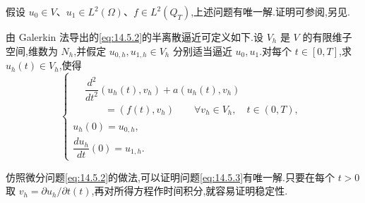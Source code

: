 假设 \(u_0\in V\)、\(u_1\in L^2(\Omega)\)、\(f\in L^2(Q_T)\),上述问题有唯一解.证明可参阅,另见.

由 Galerkin 法导出的\eqref{eq:14.5.2}的半离散逼近可定义如下.设 \(V_h\) 是 \(V\) 的有限维子空间,维数为 \(N_h\),并假定 \(u_{0,h},u_{1,h}\in V_h\) 分别适当逼近 \(u_0,u_1\).对每个 \(t\in[0,T]\),求 \(u_h(t)\in V_h\),使得
\begin{equation}\label{eq:14.5.3}
  \begin{cases}
    \begin{aligned}
      &\dfrac{d^2}{dt^2}(u_h(t),v_h)+a(u_h(t),v_h)\\
      &\qquad=(f(t),v_h)\qquad\forall v_h\in V_h,\quad t\in(0,T),
    \end{aligned}\\[2pt]
    u_h(0)=u_{0,h},\\
    \dfrac{du_h}{dt}(0)=u_{1,h}.
  \end{cases}
\end{equation}

仿照微分问题\eqref{eq:14.5.2}的做法,可以证明问题\eqref{eq:14.5.3}有唯一解.只要在每个 \(t>0\) 取 \(v_h=\partial u_h/\partial t(t)\),再对所得方程作时间积分,就容易证明稳定性.

